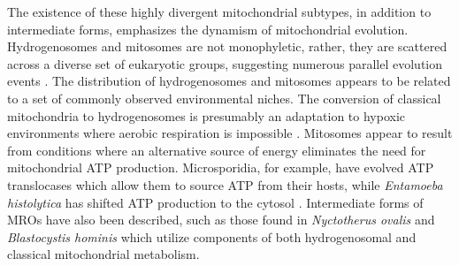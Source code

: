 \documentclass[12pt,twoside]{reedthesis}
\begin{document}
The existence of these highly divergent mitochondrial subtypes, in addition to intermediate forms, emphasizes the dynamism of mitochondrial evolution.
Hydrogenosomes and mitosomes are not monophyletic, rather, they are scattered across a diverse set of eukaryotic groups, suggesting numerous parallel evolution events \citep{shiflett_mitochondrion-related_2010}.
The distribution of hydrogenosomes and mitosomes appears to be related to a set of commonly observed environmental niches.
The conversion of classical mitochondria to hydrogenosomes is presumably an adaptation to hypoxic environments where aerobic respiration is impossible \citep{hackstein_hydrogenosomes:_1999}.
Mitosomes appear to result from conditions where an alternative source of energy eliminates the need for mitochondrial ATP production. 
Microsporidia, for example, have evolved ATP translocases which allow them to source ATP from their hosts, while \textit{Entamoeba histolytica} has shifted ATP production to the cytosol \citep{muller_biochemistry_2012}.
Intermediate forms of \gls{MROs} have also been described, such as those found in \textit{Nyctotherus ovalis} \citep{boxma_anaerobic_2005} and \textit{Blastocystis hominis} \citep{stechmann_organelles_2008} which utilize components of both hydrogenosomal and classical mitochondrial metabolism.
\end{document}
